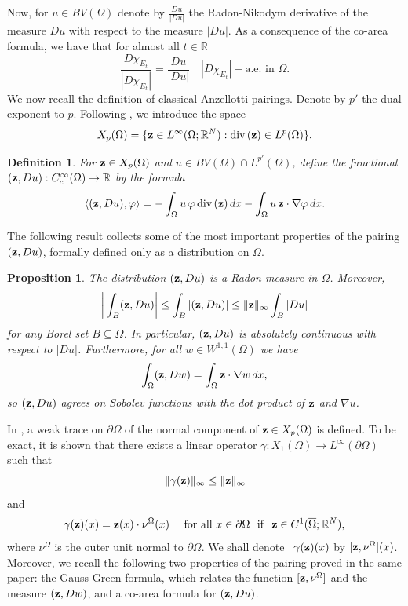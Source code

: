 \documentclass[reqno,12pt]{amsart}
\def\z{{\bf z}}
\def\divi{\hbox{\rm div\,}}
\newtheorem{definition}[theorem]{Definition}
\newtheorem{proposition}[theorem]{Proposition}
\def\divi{\hbox{\rm div\,}}
\def\R{\mathbb R}
\numberwithin{equation}{section}
\begin{document}
Now, for $u \in BV(\Omega)$ denote by $\frac{Du}{|Du|}$ the Radon-Nikodym derivative of the measure $Du$ with respect to the measure $\vert Du \vert$. As a consequence of the co-area formula, we have that for almost all $t \in \R$ 
$$ \frac{D \chi_{E_t}}{|D \chi_{E_t}|} = \frac{Du}{|Du|} \quad |D\chi_{E_t}|-\mbox{a.e. in } \Omega.$$
We now recall the definition of classical Anzellotti pairings. 
Denote by $p'$ the dual exponent to $p$. Following \cite{Anzellotti}, we introduce the space
\begin{equation}
\label{xw}
X_p(\Omega) = \{ \z \in L^{\infty}(\Omega; \R^N):
\divi(\z)\in L^p(\Omega) \}.
\end{equation}

\begin{definition}{\rm
For $\z \in X_p(\Omega)$ and $u \in BV(\Omega) \cap L^{p'}(\Omega)$,
define the functional $(\z,Du): C_c^{\infty}(\Omega) \rightarrow \R$
by the formula
\begin{equation}\label{Anzel1}
\langle (\z,Du),\varphi \rangle = - \int_{\Omega} u \, \varphi \, \divi(\z) \, dx -
\int_{\Omega} u \, \z \cdot \nabla \varphi \, dx.
\end{equation}
}

\end{definition}

The following result collects some of the most important properties of the pairing $(\z, Du)$, formally defined only as a distribution on $\Omega$.


\begin{proposition}
The distribution $(\z,Du)$ is a Radon measure in $\Omega$. Moreover,
\begin{equation}
\bigg\vert \int_{B} (\z,Du) \bigg\vert \leq \int_{B} |(\z,Du)| \leq \| \z
\|_{\infty}
\int_{B} \vert Du \vert
\end{equation}
for any Borel set $B \subseteq \Omega$. In particular, $(\z,Du)$ is absolutely continuous with respect to $\vert Du \vert$. Furthermore, for all $w \in W^{1,1}(\Omega)$ we have
\begin{equation}
\int_{\Omega} (\z,Dw) = \int_{\Omega} \z \cdot \nabla w \, dx,
\end{equation}
so $(\z,Du)$ agrees on Sobolev functions with the dot product of $\z$ and $\nabla u$.
\end{proposition}

In \cite{Anzellotti}, a weak trace on $\partial \Omega$ of the normal component of $\z \in X_p(\Omega)$ is defined. To be exact, it is shown that there exists a linear operator $\gamma : X_1(\Omega) \rightarrow L^{\infty}(\partial \Omega)$ such that $$\Vert \gamma(\z) \Vert_{\infty} \leq \Vert \z \Vert_{\infty}$$
and
$$\gamma(\z) (x) = \z(x) \cdot \nu^\Omega(x) \ \ \ \ {\rm for \ all} \ x \in
\partial
\Omega \ \ {\rm if} \
\ \z \in C^1(\overline{\Omega}; \R^N),$$
where $\nu^\Omega$ is the outer unit normal to $\partial\Omega$. We shall denote \ $\gamma (\z)(x)$ by $[\z, \nu^\Omega](x)$. Moreover, we recall the following two properties of the pairing proved in the same paper: the Gauss-Green formula, which relates the function $[\z, \nu^\Omega]$ and the measure $(\z, Dw)$, and a co-area formula for $(\z, Du)$.
\end{document}
